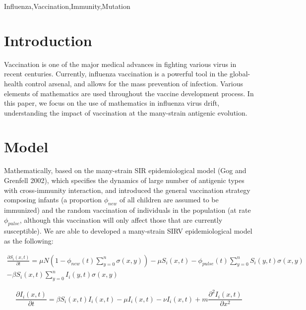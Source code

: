 \documentclass[preprint,12pt]{elsarticle}
\begin{document}
\begin{frontmatter}
\begin{keyword}
Influenza\sep Vaccination\sep Immunity\sep Mutation
\end{keyword}

\end{frontmatter}

\section{Introduction}
Vaccination is one of the major medical advances in fighting various virus in recent centuries.
Currently, influenza vaccination is a powerful tool in the global-health control arsenal, and allows for the mass prevention of infection.
Various elements of mathematics are used throughout the vaccine development process.
In this paper, we focus on the use of mathematics in influenza virus drift, understanding the impact of vaccination at the many-strain antigenic evolution. 

\section{Model}
Mathematically, based on the many-strain SIR epidemiological model (Gog and Grenfell 2002), which specifies the dynamics of large number of antigenic types with cross-immunity interaction, and introduced the general vaccination strategy composing infants (a proportion \(\phi_{new}\) of all children are assumed to be immunized) and the random vaccination of individuals in the population (at rate \(\phi_{pulse}\), although this vaccination will only affect those that are currently susceptible).
We are able to developed a many-strain SIRV epidemiological model as the following:

\begin{align}
  \label{eq:S}
  \frac{\partial S_i(x,t)}{\partial t} = \mu N(1-\phi_{new}(t)\sum_{y=0}^{n} \sigma(x,y)) - \mu S_i(x,t) - \phi_{pulse}(t)\sum_{y=0}^{n} S_i(y,t)\sigma(x,y) 
  \nonumber\\
  - \beta S_i(x,t)\sum_{y=0}^{n} I_i(y,t)\sigma(x,y)
\end{align}

\begin{equation}
  \label{eq:I}
  \frac{\partial I_i(x,t)}{\partial t} = \beta S_i(x,t) I_i(x,t) - \mu I_i(x,t) - \nu I_i(x,t) + m \frac{\partial^2I_i(x,t)}{\partial x^2}
\end{equation}
\end{document}
